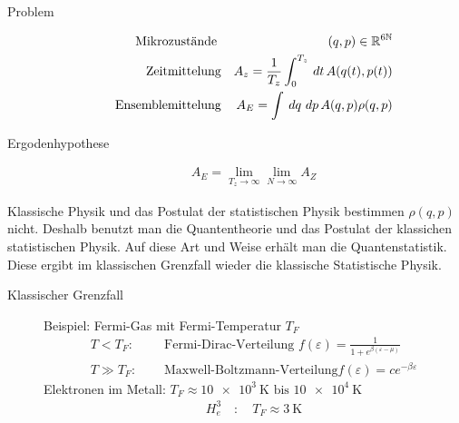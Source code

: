 \begin{description}
  \item[Problem]
    \begin{align*}
      \text{Mikrozust\"ande } && (q,p) \in \mathbb{R}^{6\mathbb{N}} \\
      \text{Zeitmittelung} && A_z = \frac{1}{T_z} \int_{0}^{T_z} \,dt\, A(q(t),p(t)) \\
      \text{Ensemblemittelung} && A_E = \int_{}^{} \,dq\,\,dp\, A(q,p) \rho(q,p) \\
    \end{align*}
  \item[Ergodenhypothese] %
    \begin{align*}
      A_E = \lim_{T_z\to  \infty} \lim_{N\to  \infty} A_Z
    \end{align*}
\end{description}
Klassische Physik und das Postulat der statistischen Physik bestimmen 
$\rho(q,p)$ nicht. Deshalb benutzt man die Quantentheorie und das Postulat
der klassichen statistischen Physik. Auf diese Art und Weise erh\"alt man
die Quantenstatistik. Diese ergibt im klassischen Grenzfall wieder die
klassische Statistische Physik. 
\begin{description}
  \item[Klassischer Grenzfall] 
    Beispiel: Fermi-Gas mit Fermi-Temperatur $T_F$ \\
      \begin{align*}
        T < T_F:& \quad \text{ Fermi-Dirac-Verteilung } f(\varepsilon)
        = \frac{1}{1 + e^{\beta(\varepsilon - \mu)}} \\
        T \gg T_F: & \quad \text{ Maxwell-Boltzmann-Verteilung} f(\varepsilon)
        = c e^{-\beta \varepsilon}
      \end{align*}
      Elektronen im Metall: $T_F \approx \SI{10e3 }{\kelvin} \text{ bis } \SI{10e4}{\kelvin}$
      \begin{align*}
        H_e^3 \quad: \quad T_F \approx \SI{3}{\kelvin}
      \end{align*}
\end{description}

